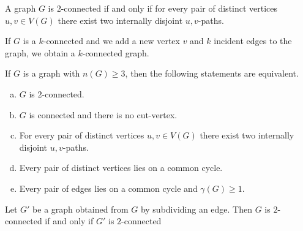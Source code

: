 \begin{theorem}[Whitney]
    A graph $G$ is $2$-connected if and only if for every 
    pair of distinct vertices $u,v \in V(G)$ there 
    exist two internally disjoint $u,v$-paths.
\end{theorem}

\begin{lemma}[Expansion]
    If $G$ is a $k$-connected and we add a new vertex $v$ 
    and $k$ incident edges to the graph, we obtain a 
    $k$-connected graph.
\end{lemma}



\begin{theorem}
    If $G$ is a graph with $n(G) \ge 3$, then the following statements are equivalent.
    \begin{enumerate}[(a)]
        \item $G$ is $2$-connected.
        \item $G$ is connected and there is no cut-vertex.
        \item For every pair of distinct vertices $u,v \in V(G)$ there 
        exist two internally disjoint $u,v$-paths.
        \item Every pair of distinct vertices lies on a common cycle.
        \item Every pair of edges lies on a common cycle and $\gamma(G) \ge 1$.
    \end{enumerate}
\end{theorem}

\begin{lemma}[Subdivision]
    Let $G'$ be a graph obtained from $G$ by subdividing an edge. Then $G$ 
    is $2$-connected if and only if $G'$ is $2$-connected
\end{lemma}